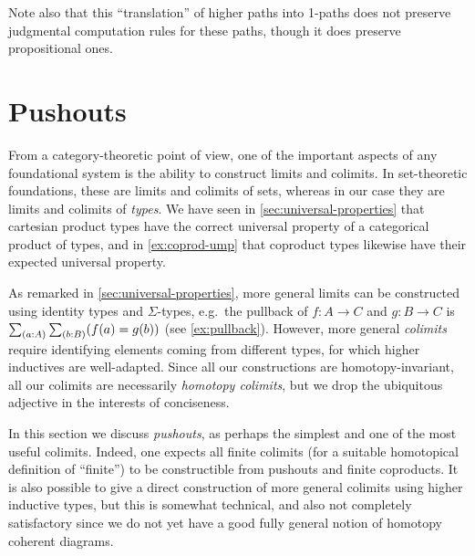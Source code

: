 \begin{rmk}
  Note also that this ``translation'' of higher paths into 1-paths does not preserve judgmental computation rules for these paths, though it does preserve propositional ones.
\end{rmk}


\section{Pushouts}
\label{sec:colimits}

%
%
From a category-theoretic point of view, one of the important aspects of any foundational system is the ability to construct limits and colimits.
In set-theoretic foundations, these are limits and colimits of sets, whereas in our case they are limits and colimits of \emph{types}.
We have seen in \autoref{sec:universal-properties} that cartesian product types have the correct universal property of a categorical product of types, and in \autoref{ex:coprod-ump} that coproduct types likewise have their expected universal property.

As remarked in \autoref{sec:universal-properties}, more general limits can be constructed using identity types and $\Sigma$-types, e.g.\ the pullback of $f:A\to C$ and $g:B\to C$ is $\sm{a:A}{b:B} (f(a)=g(b))$ (see \autoref{ex:pullback}).
However, more general \emph{colimits} require identifying elements coming from different types, for which higher inductives are well-adapted.
Since all our constructions are homotopy-invariant, all our colimits are necessarily \emph{homotopy colimits}, but we drop the ubiquitous adjective in the interests of conciseness.

In this section we discuss \emph{pushouts}, as perhaps the simplest and one of the most useful colimits.
Indeed, one expects all finite colimits (for a suitable homotopical definition of ``finite'') to be constructible from pushouts and finite coproducts.
It is also possible to give a direct construction of more general colimits using higher inductive types, but this is somewhat technical, and also not completely satisfactory since we do not yet have a good fully general notion of homotopy coherent diagrams.

